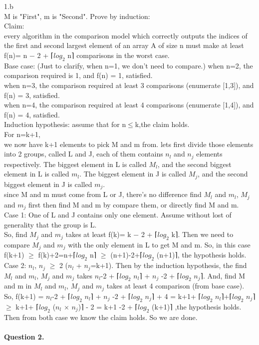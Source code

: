 \documentclass[a4paper, 10pt]{article}
\begin{document}
{1.b\\
M is "First", m is "Second".
Prove by induction:\\
Claim:\\
every algorithm in the comparison model which correctly outputs the indices of the first and second largest element of an array A of size n must make at least f(n)= n − 2 + ⌈$log_2$ n⌉ comparisons in the worst case.\\
Base case:
(Just to clarify, when n=1, we don't need to compare.)
when n=2, the comparison required is 1, and f(n) = 1, satisfied.\\
when n=3, the comparison required at least 3 comparisons (enumerate [1,3]), and f(n) = 3, satisfied.\\
when n=4, the comparison required at least 4 comparisons (enumerate [1,4]), and f(n) = 4, satisfied.\\
Induction hypothesis:
assume that for n$\leq$k,the claim holds.\\
For n=k+1,\\
we now have k+1 elements to pick M and m from. lets first divide those elements into 2 groups, called L and J, each of them contains $n_l$ and $n_j$ elements respectively. The biggest element in L is called $M_l$, and the second biggest element in L is called $m_l$. The biggest element in J is called $M_j$, and the second biggest element in J is called $m_j$. \\ since M and m must come from L or J, there's no difference find $M_l$ and $m_l$,  $M_j$ and $m_j$ first then find M and m by compare them, or directly find M and m.\\
Case 1: One of L and J contains only one element. Assume without lost of generality that the group is L.\\
So, find $M_j$ and $m_j$ takes at least f(k)= k − 2 + ⌈$log_2$ k⌉. Then we need to compare 
$M_j$ and $m_j$ with the only element in L to get M and m. So, in this case f(k+1) $\geq$ f(k)+2=n+⌈$log_2$ n⌉ $\geq$ (n+1)-2+⌈$log_2$ (n+1)⌉, the hypothesis holds.\\
Case 2: $n_l$, $n_j$ $\geq$ 2 ($n_l$ + $n_j$=k+1). Then by the induction hypothesis, the find $M_l$ and $m_l$,  $M_j$ and $m_j$ takes $n_l$-2 + ⌈$log_2$ $n_l$⌉ + $n_j$ -2 + ⌈$log_2$ $n_j$⌉. And, find M and m in $M_l$ and $m_l$,  $M_j$ and $m_j$ takes at least 4 comparison (from base case). So, f(k+1) = $n_l$-2 + ⌈$log_2$ $n_l$⌉ + $n_j$ -2 + ⌈$log_2$ $n_j$⌉ + 4 = k+1+ ⌈$log_2$ $n_l$⌉+⌈$log_2$ $n_j$⌉ $\geq$ k+1+ ⌈$log_2$ ($n_l$ $\times$ $n_j$)⌉ - 2 = k+1 -2 +  ⌈$log_2$ (k+1)⌉ ,the hypothesis holds.\\
Then from both case we know the claim holds. So we are done.
}
~\\\\
{\noindent\large\textbf{Question 2.}}
\end{document}
